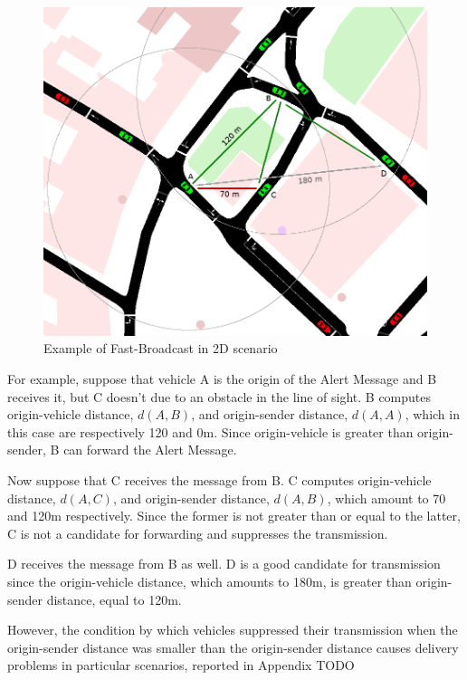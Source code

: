 		\begin{figure}[H]
			\centering
			\includegraphics[width=\textwidth]{immagini/fb-2dpicc}
			\caption{Example of Fast-Broadcast in 2D scenario}
			\label{fig:fb-2d}
		\end{figure}
		
		
		
		For example, suppose that vehicle A is the origin of the Alert Message and B receives it, but C doesn't due to an obstacle in the line of sight. B computes origin-vehicle distance, $d(A, B)$, and origin-sender distance, $d(A, A)$, which in this case are respectively 120 and 0m. Since origin-vehicle is greater than origin-sender, B can forward the Alert Message.
		
		
		Now suppose that C receives the message from B. C computes origin-vehicle distance, $d(A, C)$, and origin-sender distance, $d(A, B)$, which amount to 70 and 120m respectively. Since the former is not greater than or equal to the latter, C is not a candidate for forwarding and suppresses the transmission.
		
		
		D receives the message from B as well. D is a good candidate for transmission since the origin-vehicle distance, which amounts to 180m, is greater than origin-sender distance, equal to 120m.
		
		However, the condition by which vehicles suppressed their transmission when the origin-sender distance was smaller than the origin-sender distance causes delivery problems in particular scenarios, reported in Appendix TODO %
		

